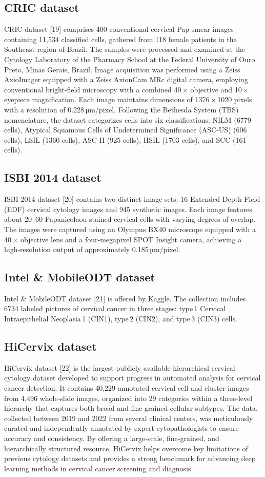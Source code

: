 \documentclass{svjour3}
\begin{document}
\subsection{CRIC dataset}
CRIC dataset [19] comprises 400 conventional cervical Pap smear images containing 11,534 classified cells, gathered from 118 female patients in the Southeast region of Brazil. The samples were processed and examined at the Cytology Laboratory of the Pharmacy School at the Federal University of Ouro Preto, Minas Gerais, Brazil. Image acquisition was performed using a Zeiss AxioImager equipped with a Zeiss AxionCam MRc digital camera, employing conventional bright‑field microscopy with a combined 40 $\times$ objective and 10 $\times$ eyepiece magnification. Each image maintains dimensions of 1376 $\times$ 1020 pixels with a resolution of 0.228 µm/pixel. Following the Bethesda System (TBS) nomenclature, the dataset categorizes cells into six classifications: NILM (6779 cells), Atypical Squamous Cells of Undetermined Significance (ASC‑US) (606 cells), LSIL (1360 cells), ASC‑H (925 cells), HSIL (1703 cells), and SCC (161 cells).
\subsection{ISBI 2014 dataset}
ISBI 2014 dataset [20] contains two distinct image sets: 16 Extended Depth Field (EDF) cervical cytology images and 945 synthetic images. Each image features about 20–60 Papanicolaou‑stained cervical cells with varying degrees of overlap. The images were captured using an Olympus BX40 microscope equipped with a 40 $\times$ objective lens and a four‑megapixel SPOT Insight camera, achieving a high‑resolution output of approximately 0.185 µm/pixel.
\subsection{Intel \& MobileODT dataset}
Intel \& MobileODT dataset [21] is offered by Kaggle. The collection includes 6734 labeled pictures of cervical cancer in three stages: type 1 Cervical Intraepithelial Neoplasia 1 (CIN1), type 2 (CIN2), and type 3 (CIN3) cells.
\subsection{HiCervix dataset}
HiCervix dataset [22] is the largest publicly available hierarchical cervical cytology dataset developed to support progress in automated analysis for cervical cancer detection. It contains 40,229 annotated cervical cell and cluster images from 4,496 whole‑slide images, organized into 29 categories within a three‑level hierarchy that captures both broad and fine‑grained cellular subtypes. The data, collected between 2019 and 2022 from several clinical centers, was meticulously curated and independently annotated by expert cytopathologists to ensure accuracy and consistency. By offering a large‑scale, fine‑grained, and hierarchically structured resource, HiCervix helps overcome key limitations of previous cytology datasets and provides a strong benchmark for advancing deep learning methods in cervical cancer screening and diagnosis.
\end{document}
